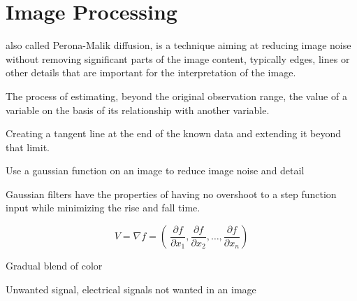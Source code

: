 \section{Image Processing}

\begin{definition}
    also called Perona-Malik diffusion, is a technique aiming at reducing image
    noise without removing significant parts of the image content, typically
    edges, lines or other details that are important for the interpretation of
    the image.

\end{definition}

\begin{definition}[extrapolation]
    The process of estimating, beyond the original observation range, the value
    of a variable on the basis of its relationship with another variable.

    Creating a tangent line at the end of the known data and extending it
    beyond that limit.

\end{definition}



\begin{definition}
    Use a gaussian function on an image to reduce image noise and detail
\end{definition}

\begin{definition}
    Gaussian filters have the properties of having no overshoot to a step
    function input while minimizing the rise and fall time.

\end{definition}


\begin{definition}
    $$
        V = \nabla{f} = \left(\
        \frac{\partial{f}}{\partial{x_{1}}},
        \frac{\partial{f}}{\partial{x_{2}}},
        \dots,
        \frac{\partial{f}}{\partial{x_{n}}}
    \right)
    $$
\end{definition}

\begin{definition}
    Gradual blend of color
\end{definition}

\begin{definition}
    Unwanted signal, electrical signals not wanted in an image
\end{definition}



